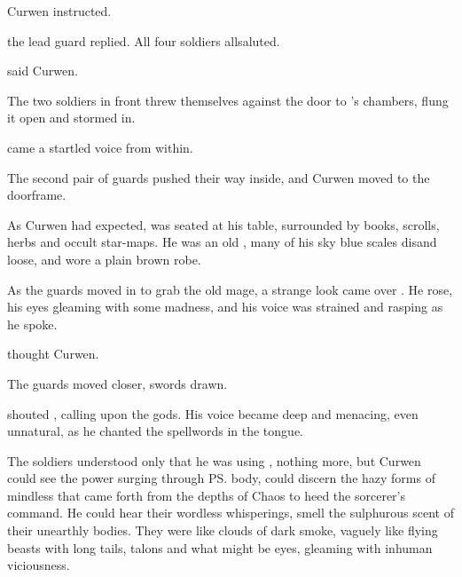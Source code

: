 \begin{comment}
\subsection{\Ambrose{} \Onatol{}}
\end{comment}

%
 Curwen instructed. 

 the lead guard replied. 
All four soldiers\dash \scathae{} all\dash saluted. 

 said Curwen. 

The two soldiers in front threw themselves against the door to \Ambrose \Onatol's chambers, flung it open and stormed in. 

 came a startled \scathaese voice from within.

The second pair of guards pushed their way inside, and Curwen moved to the doorframe. 

As Curwen had expected, \Onatol was seated at his table, surrounded by books, scrolls, herbs and occult star-maps. 
He was an old \dax{}, many of his sky blue scales dis\coloured and loose, and wore a plain brown robe. 


As the guards moved in to grab the old mage, a strange look came over \Onatol. 
He rose, his eyes gleaming with some madness, and his voice was strained and rasping as he spoke. 

 thought Curwen.

The guards moved closer, swords drawn.

 shouted \Onatol, calling upon the \Ortaican{} gods. 
His voice became deep and menacing, even unnatural, as he chanted the spellwords in the \Draconic{} tongue. 

The soldiers understood only that he was using , nothing more, but Curwen could see the \chaotic{} power surging through \ps{\Onatol}{} body, could discern the hazy forms of mindless  that came forth from the depths of Chaos to heed the sorcerer's command.  
He could hear their wordless whisperings, smell the sulphurous scent of their unearthly bodies. 
They were like clouds of dark smoke, vaguely like flying beasts with long tails, talons and what might be eyes, gleaming with inhuman viciousness. 

